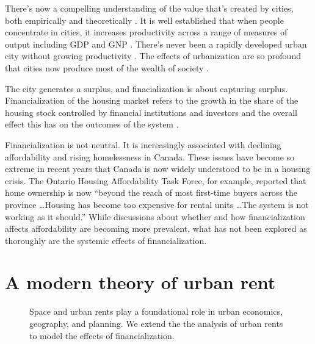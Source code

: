 There's now a compelling understanding of the value that's created by cities, both empirically and theoretically \cite{jacobsEconomyCities1969, spenceUrbanizationGrowth2009, bettencourtIntroductionUrbanScience2021}. 
 It is well established that when people concentrate in cities, it increases productivity across a range of measures of output including GDP and GNP \cite{bettencourtIntroductionUrbanScience2021}. There's never been a rapidly developed urban city without growing productivity \cite{annezUrbanizationGrowthSetting2009}. The effects of urbanization are so profound that cities now produce most of the wealth of society \cite{GET_cities-most-of-wealth}. 

The city generates a surplus, and finacialization is about capturing surplus. Financialization of the housing market refers to the growth in the share of the housing stock controlled by financial institutions and investors and the overall effect this has on the outcomes of the system \cite{farhaReportFinancializationHousing2017, hansenFinanceCapitalismFinancialization2014}.  

Financialization is not neutral. It is increasingly associated with declining affordability and rising homelessness in Canada. These issues have become so extreme in recent years that Canada is now widely understood to be in a housing crisis. The Ontario Housing Affordability Task Force, for example, reported that home ownership is now ``beyond the reach of most first-time buyers across the province \dots Housing has become too expensive for rental units \dots The system is not working as it should.'' While discussions about whether and how financialization affects affordability are becoming more prevalent, what has not been explored as thoroughly are the systemic effects of financialization. %

\section{A modern theory of urban rent}
\begin{figure}[!ht]
\centering

\caption[Linking space and urban rents to the effects of financialization.]{Space and urban rents play a foundational role in urban economics, geography, and planning. We extend the the analysis of urban rents to model the effects of financialization.}
\label{fig-fields}
\end{figure}

